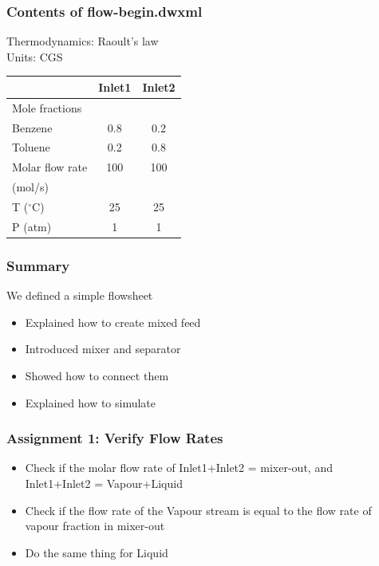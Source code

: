 \documentclass[17pt,xcolor=table]{beamer}
\begin{document}
\begin{frame} 
  \frametitle{Contents of {\color{blue}flow-begin.dwxml}}
\vspace{-0.15in}
Thermodynamics: Raoult's law \\
Units: CGS
\begin{center}
  \begin{tabular}{|l|c|c|}\hline
&    \textbf{\color{blue}Inlet1} & \textbf{\color{blue}Inlet2}\\
    \hline	
Mole fractions & & \\
Benzene & 0.8 & 0.2 \\
Toluene & 0.2 & 0.8 \\ \hline
Molar flow rate & 100 & 100 \\
(mol/s) & & \\ \hline
T ($^\circ$C) & 25 & 25 \\ \hline
P (atm) & 1 & 1 \\ \hline
\end{tabular}
\end{center}
\end{frame}

\begin{frame}
  \frametitle{Summary}
  We defined a simple flowsheet
  \begin{itemize}
  \item Explained how to create mixed feed
  \item Introduced mixer and separator
  \item Showed how to connect them
  \item Explained how to simulate
  \end{itemize}
\end{frame}

\begin{frame}
  \frametitle{Assignment 1: Verify Flow Rates}
\vspace{-0.4in}
  \begin{itemize}
  \item Check if the molar flow rate of
    {\color{blue}Inlet1}+{\color{blue}Inlet2} =
    {\color{blue}mixer-out}, and \\
    {\color{blue}Inlet1}+{\color{blue}Inlet2} = 
    {\color{blue}Vapour}+{\color{blue}Liquid} 
  \item Check if the flow rate of the {\color{blue}Vapour} stream is
    equal to the 
    flow rate of vapour fraction in {\color{blue}mixer-out}
  \item Do the same thing for {\color{blue}Liquid}
  \end{itemize}
\end{frame}
\end{document}

